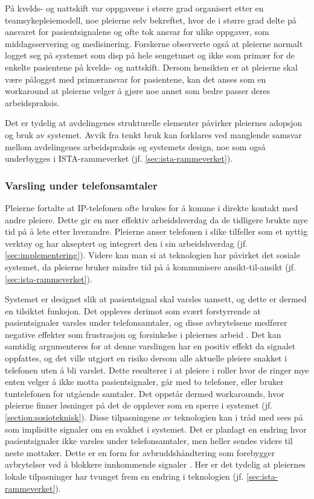 \noindent
På kvelds- og nattskift var oppgavene i større grad organisert etter en teamsykepleiemodell, noe pleierne selv bekreftet, hvor de i større grad delte på ansvaret for pasientsignalene og ofte tok ansvar for ulike oppgaver, som middagsservering og medisinering. Forskerne observerte også at pleierne normalt logget seg på systemet som disp på hele sengetunet og ikke som primær for de enkelte pasientene på kvelds- og nattskift. Dersom hensikten er at pleierne skal være pålogget med primæransvar for pasientene, kan det anses som en workaround at pleierne velger å gjøre noe annet som bedre passer deres arbeidspraksis.

\noindent
Det er tydelig at avdelingenes strukturelle elementer påvirker pleiernes adopsjon og bruk av systemet. Avvik fra tenkt bruk kan forklares ved manglende samsvar mellom avdelingenes arbeidspraksis og systemets design, noe som også underbygges i ISTA-rammeverket (jf. \ref{sec:ista-rammeverket}). 

\subsubsection{Varsling under telefonsamtaler}
Pleierne fortalte at IP-telefonen ofte brukes for å komme i direkte kontakt med andre pleiere. Dette gir en mer effektiv arbeidshverdag da de tidligere brukte mye tid på å lete etter hverandre. Pleierne anser telefonen i slike tilfeller som et nyttig verktøy og har akseptert og integrert den i sin arbeidshverdag (jf. \ref{sec:implementering}). Videre kan man si at teknologien har påvirket det sosiale systemet, da pleierne bruker mindre tid på å kommunisere ansikt-til-ansikt (jf. \ref{sec:ista-rammeverket}). 

\noindent
Systemet er designet slik at pasientsignal skal varsles uansett, og dette er dermed en tilsiktet funksjon. Det oppleves derimot som svært forstyrrende at pasientsignaler varsles under telefonsamtaler, og disse avbrytelsene medfører negative effekter som frustrasjon og forsinkelse i pleiernes arbeid \citep{Grundgeiger09}. Det kan samtidig argumenteres for at denne varslingen har en positiv effekt da signalet oppfattes, og det ville utgjort en risiko dersom alle aktuelle pleiere snakket i telefonen uten å bli varslet. Dette resulterer i at pleiere i roller hvor de ringer mye enten velger å ikke motta pasientsignaler, går med to telefoner, eller bruker tuntelefonen for utgående samtaler. Det oppstår dermed workarounds, hvor pleierne finner løsninger på det de opplever som en sperre i systemet (jf. \ref{section:sosioteknisk}). Disse tilpasningene av teknologien kan i tråd med \citet{Coiera07} sees på som implisitte signaler om en svakhet i systemet. Det er planlagt en endring hvor pasientsignaler ikke varsles under telefonsamtaler, men heller sendes videre til neste mottaker. Dette er en form for avbruddshåndtering som forebygger avbrytelser ved å blokkere innkommende signaler \citep{Grandhi10}. Her er det tydelig at pleiernes lokale tilpasninger har tvunget frem en endring i teknologien (jf. \ref{sec:ista-rammeverket}).
	

